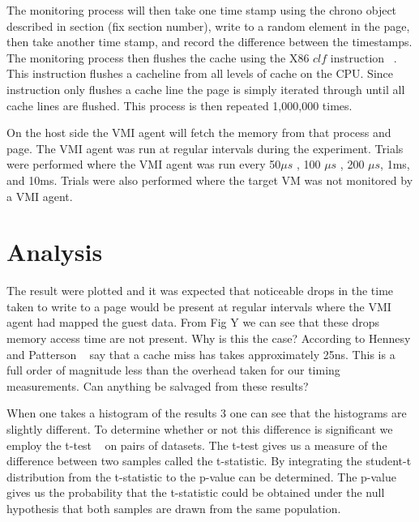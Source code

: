 \begin{algorithm}\label{CacheProbe}
\end{algorithm}


The monitoring process will then take one time stamp using the chrono object described in section (fix section number), write to a random element in the page, then take another time stamp, and record the difference between the timestamps. The monitoring process then flushes the cache using the X86 $clf$ instruction ~\cite{_intel_2014}. This instruction flushes a cacheline from all levels of cache on the CPU. Since instruction only flushes a cache line the page is simply iterated through until all cache lines are flushed. This process is then repeated 1,000,000 times. 

On the host side the VMI agent will fetch the memory from that process and page. The VMI agent was run at regular intervals during the experiment. Trials were performed where the VMI agent was run every 50$\mu s$ , 100 $\mu s$ , 200 $\mu s$, 1ms, and 10ms. Trials were also performed where the target VM was not monitored by a VMI agent. 

\section{Analysis}

The result were plotted and it was expected that noticeable drops in the time taken to write to a page would be present at regular intervals where the VMI agent had mapped the guest data. From Fig Y we can see that these drops memory access time are not present. Why is this the case? According to Hennesy and Patterson ~\cite{hennessy_computer_2012} say that a cache miss has takes approximately 25ns. This is a full order of magnitude less than the overhead taken for our timing measurements. Can anything be salvaged from these results? 

When one takes a histogram of the results 3 one can see that the histograms are slightly different. To determine whether or not this difference is significant we employ the t-test ~\cite{welch_generalization_1947} on pairs of datasets. The t-test gives us a measure of the difference between two samples called the t-statistic. By integrating the student-t distribution from the t-statistic to the p-value can be determined. The p-value gives us the probability that the t-statistic could be obtained under the null hypothesis that both samples are drawn from the same population. 

